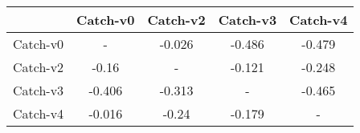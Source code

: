 \begin{tabular}{c|c|c|c|c}
& Catch-v0 & Catch-v2 & Catch-v3 & Catch-v4 \\ \hline\hline
Catch-v0 &       -   &   -0.026 &   -0.486 &   -0.479 \\
Catch-v2 &    -0.16 &       -   &   -0.121 &   -0.248 \\
Catch-v3 &   -0.406 &   -0.313 &      -    &   -0.465 \\
Catch-v4 &   -0.016 &    -0.24 &   -0.179 &       -   \\
\hline
\end{tabular}
